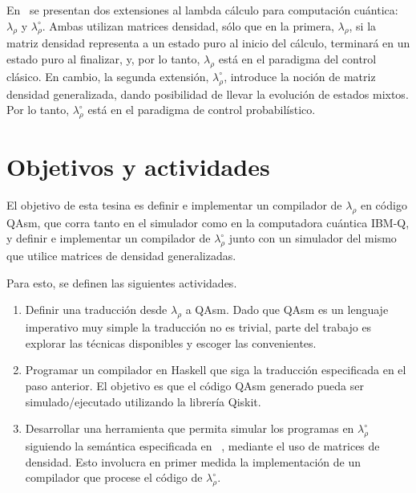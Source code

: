 \documentclass[a4paper]{article}
\begin{document}
En~\cite{DiazcaroAPLAS17} se presentan dos extensiones al lambda cálculo para
computación cuántica: $\lambda_\rho$ y $\lambda_\rho^\circ$. Ambas utilizan
matrices densidad, sólo que en la primera, $\lambda_\rho$, si la matriz densidad representa a un
estado puro al inicio del cálculo, terminará en un estado puro al finalizar, y,
por lo tanto, $\lambda_\rho$ está en el paradigma del control clásico. En
cambio, la segunda extensión, $\lambda_\rho^\circ$, introduce la noción de
matriz densidad generalizada, dando posibilidad de llevar la evolución de
estados mixtos. Por lo tanto, $\lambda_\rho^\circ$ está en el paradigma de
control probabilístico.


\section*{Objetivos y actividades}
El objetivo de esta tesina es definir e implementar un compilador de
$\lambda_\rho$ en código QAsm, que corra tanto en el simulador como en la
computadora cuántica IBM-Q, y definir e implementar un compilador de
$\lambda_\rho^\circ$ junto con un simulador del mismo que utilice matrices de densidad generalizadas.

Para esto, se definen las siguientes actividades.
\begin{enumerate}
\item Definir una traducción desde $\lambda_\rho$ a
  QAsm. Dado que QAsm es un lenguaje imperativo muy simple la traducción no es trivial, parte del trabajo es explorar las técnicas disponibles y escoger las convenientes.
\item Programar un compilador en Haskell que siga la traducción especificada en el paso anterior. El objetivo es que el código QAsm generado pueda ser simulado/ejecutado utilizando la librería Qiskit.
\item Desarrollar una herramienta que permita simular los programas en $\lambda_\rho^\circ$ siguiendo la semántica especificada en ~\cite{DiazcaroAPLAS17}, mediante el uso de matrices de densidad. Esto involucra en primer medida la implementación de un compilador que procese el código de $\lambda_\rho^\circ$.
\end{enumerate}


 
\end{document}
